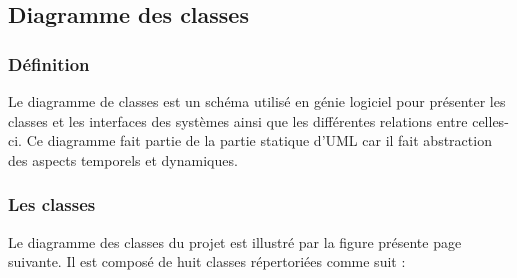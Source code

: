 \subsection {Diagramme des classes}
\subsubsection{Définition}
Le diagramme de classes est un schéma utilisé en génie logiciel pour présenter les classes et les interfaces des systèmes ainsi que les différentes relations entre celles-ci. Ce diagramme fait partie de la partie statique d'UML car il fait abstraction des aspects temporels et dynamiques.

\subsubsection{Les classes}
Le diagramme des classes du projet est illustré par la figure présente page suivante. Il est composé de huit classes répertoriées comme suit :

